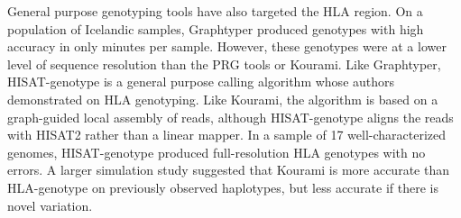 General purpose genotyping tools have also targeted the HLA region.
On a population of Icelandic samples, Graphtyper \cite{eggertsson2017graphtyper} produced genotypes with high accuracy in only minutes per sample.
However, these genotypes were at a lower level of sequence resolution than the PRG tools or Kourami.
Like Graphtyper, HISAT-genotype \cite{Kim_2019} is a general purpose calling algorithm whose authors demonstrated on HLA genotyping.
Like Kourami, the algorithm is based on a graph-guided local assembly of reads, although HISAT-genotype aligns the reads with HISAT2 rather than a linear mapper.
In a sample of 17 well-characterized genomes, HISAT-genotype produced full-resolution HLA genotypes with no errors.
A larger simulation study suggested that Kourami is more accurate than HLA-genotype on previously observed haplotypes, but less accurate if there is novel variation.





